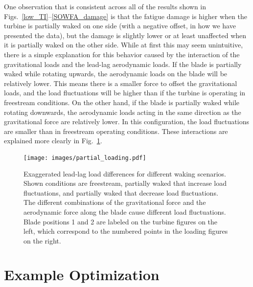 \documentclass[11pt,letterpaper]{article}
\begin{document}
One observation that is consistent across all of the results shown in Figs.~\ref{low_TI}--\ref{SOWFA_damage} is that the fatigue damage is higher when the turbine is partially waked on one side (with a negative offset, in how we have presented the data), but the damage is slightly lower or at least unaffected when it is partially waked on the other side. While at first this may seem unintuitive, there is a simple explanation for this behavior caused by the interaction of the gravitational loads and the lead-lag aerodynamic loads. If the blade is partially waked while rotating upwards, the aerodynamic loads on the blade will be relatively lower. This means there is a smaller force to offset the gravitational loads, and the load fluctuations will be higher than if the turbine is operating in freestream conditions. On the other hand, if the blade is partially waked while rotating downwards, the aerodynamic loads acting in the same direction as the gravitational force are relatively lower. In this configuration, the load fluctuations are smaller than in freestream operating conditions. These interactions are explained more clearly in Fig.~\ref{partial_loading}.
% 
\begin{figure}
    \centering
    \texttt{[image: images/partial\_loading.pdf]}
    \caption{Exaggerated lead-lag load differences for different waking scenarios. Shown conditions are freestream, partially waked that increase load fluctuations, and partially waked that decrease load fluctuations. The different combinations of the gravitational force and the aerodynamic force along the blade cause different load fluctuations. Blade positions 1 and 2 are labeled on the turbine figures on the left, which correspond to the numbered points in the loading figures on the right. }
    \label{partial_loading}
\end{figure}

\section{Example Optimization}
\end{document}
